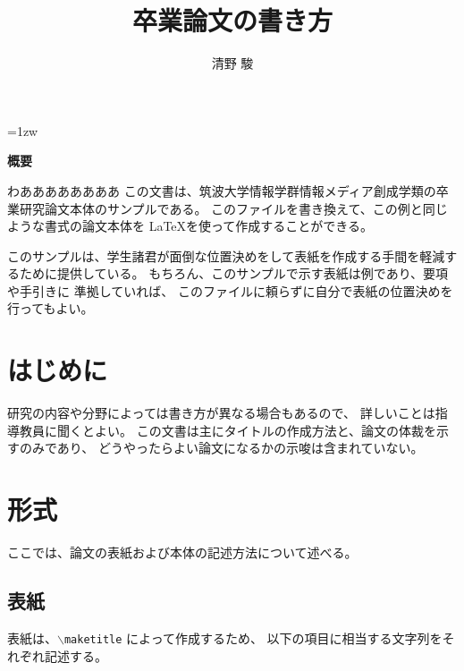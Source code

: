 \documentclass[a4paper,11pt]{jreport}
\title{卒業論文の書き方}
\author{清野 駿}
\begin{document}
\maketitle
\thispagestyle{empty}
\newpage

\thispagestyle{empty}
\vspace*{20pt plus 1fil}
\parindent=1zw
\noindent
\begin{center}
{\bf 概要}
\vspace{5mm}
\end{center}
わああああああああ
この文書は、筑波大学情報学群情報メディア創成学類の卒業研究論文本体のサンプルである。
このファイルを書き換えて、この例と同じような書式の論文本体を \LaTeX を使って作成することができる。

このサンプルは、学生諸君が面倒な位置決めをして表紙を作成する手間を軽減するために提供している。
もちろん、このサンプルで示す表紙は例であり、要項や手引きに 準拠していれば、
このファイルに頼らずに自分で表紙の位置決めを行ってもよい。

\par
\vspace{0pt plus 1fil}
\newpage

\tableofcontents
\listoffigures

\pagebreak \setcounter{page}{1}


\chapter{はじめに}

研究の内容や分野によっては書き方が異なる場合もあるので、
詳しいことは指導教員に聞くとよい。
この文書は主にタイトルの作成方法と、論文の体裁を示すのみであり、
どうやったらよい論文になるかの示唆は含まれていない。

\chapter{形式}

ここでは、論文の表紙および本体の記述方法について述べる。

\section{表紙}

表紙は、{\tt $\backslash$maketitle} によって作成するため、
以下の項目に相当する文字列をそれぞれ記述する。
\end{document}

